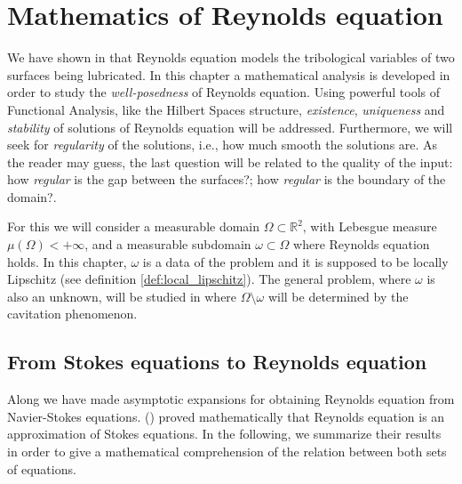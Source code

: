 \chapter{Mathematics of Reynolds equation}
\label{chap:maths_reynolds_equation} %

We have shown in  that Reynolds equation models the tribological variables of two surfaces being lubricated. In this  chapter a mathematical analysis is developed in order to study the \emph{well-posedness} of Reynolds equation. Using powerful tools of Functional Analysis, like the Hilbert Spaces structure, \emph{existence}, \emph{uniqueness} and \emph{stability} of solutions of Reynolds equation will be addressed. Furthermore, we will seek for \emph{regularity} of the solutions, i.e., how much smooth the solutions are. As the reader may guess, the last question will be related to the quality of the input: how \emph{regular} is the gap between the surfaces?; how \emph{regular} is the boundary of the domain?.

For this we will consider a measurable domain $\Omega\subset\mathbb{R}^2$, with Lebesgue measure \break $\mu(\Omega)<+\infty$, and a measurable subdomain $\omega\subset  \Omega$ where Reynolds equation holds. In this chapter, $\omega$ is a data of the problem and it is supposed to be locally Lipschitz (see definition \ref{def:local_lipschitz}). The general problem, where $\omega$ is also an unknown, will be studied in  where $\Omega \setminus \omega$ will be determined by the cavitation phenomenon.

\section{From Stokes equations to Reynolds equation}
Along  we have made asymptotic expansions for obtaining Reynolds equation from Navier-Stokes equations. \citeauthor{chambat1986} (\citeyear{chambat1986}) \cite{chambat1986} proved mathematically that Reynolds equation is an approximation of Stokes equations. In the following, we summarize their results in order to give a mathematical comprehension of the relation between both sets of equations. 

